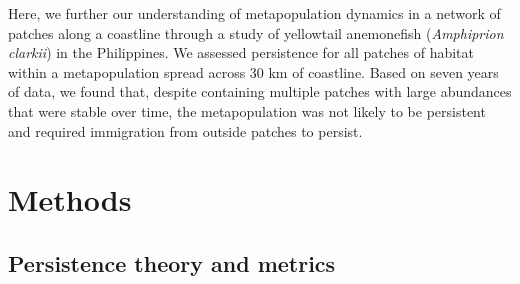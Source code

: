 \documentclass[12pt, oneside]{article}   	%
\begin{document}

Here, we further our understanding of metapopulation dynamics in a network of patches along a coastline through a study of yellowtail anemonefish (\textit{Amphiprion clarkii}) in the Philippines. We assessed persistence for all patches of habitat within a metapopulation spread across 30 km of coastline. Based on seven years of data, we found that, despite containing multiple patches with large abundances that were stable over time, the metapopulation was not likely to be persistent and required immigration from outside patches to persist.%

\section*{Methods} %

\subsection*{Persistence theory and metrics}
\end{document}

